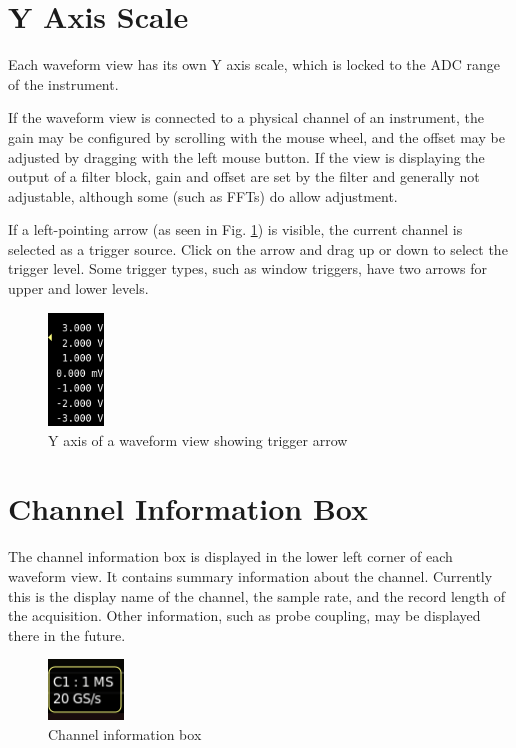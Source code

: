 \section{Y Axis Scale}

Each waveform view has its own Y axis scale, which is locked to the ADC range of the instrument.

If the waveform view is connected to a physical channel of an instrument, the gain may be configured by scrolling with
the mouse wheel, and the offset may be adjusted by dragging with the left mouse button. If the view is displaying the
output of a filter block, gain and offset are set by the filter and generally not adjustable, although some (such as
FFTs) do allow adjustment.

If a left-pointing arrow (as seen in Fig. \ref{y-axis}) is visible, the current channel is selected as a trigger
source. Click on the arrow and drag up or down to select the trigger level. Some trigger types, such as window triggers,
have two arrows for upper and lower levels.

\begin{figure}[H]
\centering
\includegraphics[height=3cm]{images/y-axis.png}
\caption{Y axis of a waveform view showing trigger arrow}
\label{y-axis}
\end{figure}

\section{Channel Information Box}

The channel information box is displayed in the lower left corner of each waveform view. It contains summary
information about the channel. Currently this is the display name of the channel, the sample rate, and the record
length of the acquisition. Other information, such as probe coupling, may be displayed there in the future.

\begin{figure}[H]
\centering
\includegraphics[width=2cm]{images/channel-infobox.png}
\caption{Channel information box}
\label{channel-infobox}
\end{figure}


